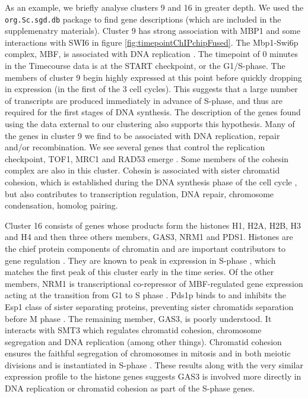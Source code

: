 \documentclass{bioinfo}
\begin{document}
As an example, we briefly analyse clusters 9 and 16 in greater depth. We used the \texttt{org.Sc.sgd.db} \citep{carlson2014org} package to find gene descriptions (which are included in the supplemenatry materials). Cluster 9 has strong association with MBP1 and some interactions with SWI6 in figure \ref{fig:timepointChIPchipFused}. The Mbp1-Swi6p complex, MBF, is associated with DNA replication \citep{iyer2001genomic}. The timepoint of 0 minutes in the Timecourse data is at the START checkpoint, or the G1/S-phase. The members of cluster 9 begin highly expressed at this point before quickly dropping in expression (in the first of the 3 cell cycles). This suggests that a large number of transcripts are produced immediately in advance of S-phase, and thus are required for the first stages of DNA synthesis. The description of the genes found using the data external to our clustering also supports this hypothesis. Many of the genes in cluster 9 we find to be associated with DNA replication, repair and/or recombination. We see several genes that control the replication checkpoint, TOF1, MRC1 and RAD53 emerge \citep{bando2009csm3, lao2018yeast}. Some members of the cohesin complex are also in this cluster. Cohesin is associated with sister chromatid cohesion, which is established during the DNA synthesis phase of the cell cycle \citep{toth1999yeast}, but also contributes to  transcription regulation, DNA repair, chromosome condensation, homolog pairing\citep{mehta2013cohesin}.

Cluster 16 consists of genes whose products form the histones H1, H2A, H2B, H3 and H4 and then three others members, GAS3, NRM1 and PDS1.  Histones are the chief protein components of chromatin \citep{fischle2003histone} and are important contributors to gene regulation \citep{bannister2011regulation}. They are known to peak in expression in S-phase \citep{granovskaia2010high}, which matches the first peak of this cluster early in the time series. Of the other members, NRM1 is transcriptional co-repressor of MBF-regulated gene expression acting at the transition from G1 to S phase \citep{de2006constraining, aligianni2009fission}. Pds1p binds to and inhibits the Esp1 class of sister separating proteins, preventing sister chromatids separation before M phase \citep{ciosk1998esp1, toth1999yeast}. The remaining member, GAS3, is poorly understood. It interacts with SMT3 which regulates chromatid cohesion, chromosome segregation and DNA replication (among other things). Chromatid cohesion ensures the faithful segregation of chromosomes in mitosis and in both meiotic divisions \citep{cooper2009pds1p} and is instantiated in S-phase \citep{toth1999yeast}. These results along with the very similar expression profile to the histone genes suggests GAS3 is involved more directly in DNA replication or chromatid cohesion as part of the S-phase genes.
\end{document}
